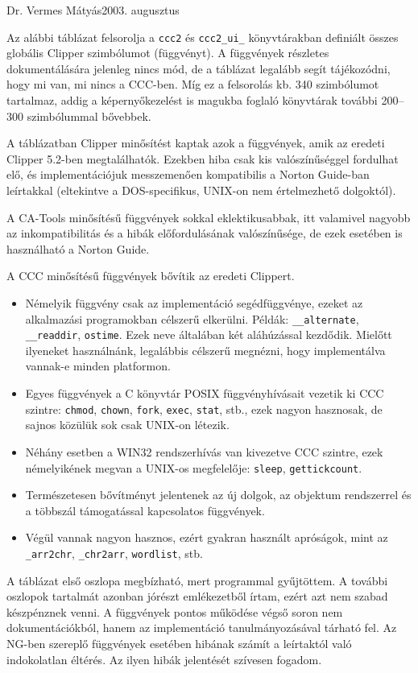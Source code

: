 
%
{Dr. Vermes Mátyás}{2003. augusztus}
 
Az alábbi táblázat felsorolja a \verb!ccc2! és \verb!ccc2_ui_! 
könyvtárakban definiált összes globális Clipper szimbólumot (függvényt). 
A függvények részletes dokumentálására jelenleg nincs mód,
de a táblázat legalább segít tájékozódni, hogy mi van, mi nincs
a CCC-ben. Míg ez a felsorolás kb. 340 szimbólumot tartalmaz,
addig a képernyőkezelést is magukba foglaló könyvtárak
további 200--300 szimbólummal bővebbek.

A táblázatban Clipper minősítést kaptak azok a függvények,
amik az eredeti Clipper 5.2-ben megtalálhatók. Ezekben
hiba csak kis valószínűséggel fordulhat elő, és implementációjuk
messzemenően kompatibilis a Norton Guide-ban leírtakkal
(eltekintve a DOS-specifikus, UNIX-on nem értelmezhető dolgoktól).

A CA-Tools minősítésű függvények sokkal eklektikusabbak,
itt valamivel nagyobb az inkompatibilitás és a hibák előfordulásának 
valószínűsége, de ezek esetében is használható a Norton Guide.


A CCC minősítésű függvények bővítik az eredeti Clippert.
\begin{itemize}
\item 
  Némelyik függvény csak az implementáció segédfüggvénye,
  ezeket az alkalmazási programokban célszerű elkerülni.
  Példák: \verb!__alternate!, \verb!__readdir!, \verb!ostime!.
  Ezek neve általában két aláhúzással kezdődik.
  Mielőtt ilyeneket használnánk, legalábbis célszerű megnézni,
  hogy implementálva vannak-e minden platformon.
\item 
  Egyes függvények a C könyvtár POSIX függvényhívásait vezetik
  ki CCC szintre: 
  \verb!chmod!,
  \verb!chown!, 
  \verb!fork!, 
  \verb!exec!, 
  \verb!stat!, stb., ezek nagyon hasznosak, de sajnos közülük
  sok csak UNIX-on létezik.
\item
  Néhány esetben a WIN32 rendszerhívás  van kivezetve CCC szintre,
  ezek némelyikének megvan a UNIX-os megfelelője: 
  \verb!sleep!, \verb!gettickcount!.
\item 
  Természetesen bővítményt jelentenek az új dolgok, 
  az objektum rendszerrel és 
  a többszál támogatással kapcsolatos függvények.
\item
  Végül vannak nagyon hasznos, ezért gyakran használt  
  apróságok, mint az 
  \verb!_arr2chr!,
  \verb!_chr2arr!,
  \verb!wordlist!, stb.
\end{itemize}

A táblázat első oszlopa megbízható, mert programmal gyűjtöttem. 
A további oszlopok tartalmát azonban jórészt emlékezetből írtam, 
ezért azt nem szabad készpénznek venni. 
A függvények pontos működése végső soron nem dokumentációkból, 
hanem az implementáció tanulmányozásával tárható fel. Az NG-ben 
szereplő függvények esetében hibának számít a leírtaktól való 
indokolatlan éltérés. Az ilyen hibák jelentését szívesen fogadom.




